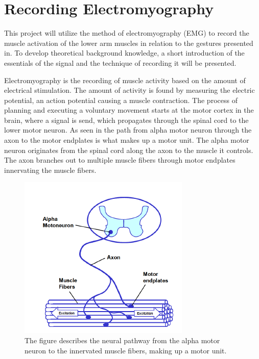 

\section{Recording Electromyography} \label{sec:EMG}

This project will utilize the method of electromyography (EMG) to record the muscle activation of the lower arm muscles in relation to the gestures presented in. To develop theoretical background knowledge, a short introduction of the essentials of the signal and the technique of recording it will be presented. 


Electromyography is the recording of muscle activity based on the amount of electrical stimulation. The amount of activity is found by measuring the electric potential, an action potential causing a muscle contraction. The process of planning and executing a voluntary movement starts at the motor cortex in the brain, where a signal is send, which propagates through the spinal cord to the lower motor neuron. As seen in  the path from alpha motor neuron through the axon to the motor endplates is what makes up a motor unit. The alpha motor neuron originates from the spinal cord along the axon to the muscle it controls. The axon branches out to multiple muscle fibers through motor endplates innervating the muscle fibers.

\begin{figure}[H]                                         
	\includegraphics[width=.4\textwidth]{figures/motor_unit}  
	\caption{The figure describes the neural pathway from the alpha motor neuron to the innervated muscle fibers, making up a motor unit.\cite{Konrad2005}}
	\label{fig:motor} 
\end{figure}  


